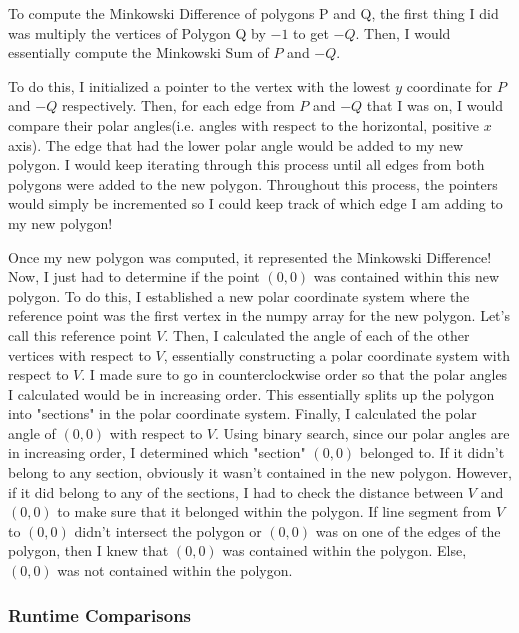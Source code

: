 \documentclass{article}
\begin{document}
To compute the Minkowski Difference of polygons P and Q, the first thing I did was multiply the vertices of Polygon Q by $-1$ to get $-Q$. Then, I would essentially compute the Minkowski Sum of $P$ and $-Q$. \newline 

To do this, I initialized a pointer to the vertex with the lowest $y$ coordinate for $P$ and $-Q$ respectively. Then, for each edge from $P$ and $-Q$ that I was on, I would compare their polar angles(i.e. angles with respect to the horizontal, positive $x$ axis). The edge that had the lower polar angle would be added to my new polygon. I would keep iterating through this process until all edges from both polygons were added to the new polygon. Throughout this process, the pointers would simply be incremented so I could keep track of which edge I am adding to my new polygon!\newline 

Once my new polygon was computed, it represented the Minkowski Difference! Now, I just had to determine if the point $(0,0)$ was contained within this new polygon. To do this, I established a new polar coordinate system where the reference point was the first vertex in the numpy array for the new polygon. Let's call this reference point $V$. Then, I calculated the angle of each of the other vertices with respect to $V$, essentially constructing a polar coordinate system with respect to $V$.  I made sure to go in counterclockwise order so that the polar angles I calculated would be in increasing order. This essentially splits up the polygon into "sections" in the polar coordinate system. Finally, I calculated the polar angle of $(0,0)$ with respect to $V$. Using binary search, since our polar angles are in increasing order, I determined which "section" $(0,0)$ belonged to. If it didn't belong to any section, obviously it wasn't contained in the new polygon. However, if it did belong to any of the sections, I had to check the distance between $V$ and $(0,0)$ to make sure that it belonged within the polygon. If line segment from $V$ to $(0,0)$ didn't intersect the polygon or $(0,0)$ was on one of the edges of the polygon, then I knew that $(0,0)$ was contained within the polygon. Else, $(0,0)$ was not contained within the polygon.

\subsubsection{Runtime Comparisons}
\end{document}
